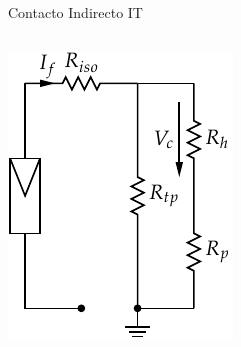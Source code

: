 \documentclass[xcolor={usenames,svgnames,dvipsnames}]{beamer}
\begin{document}
\begin{frame}[label={sec:org03291de}]{Contacto Indirecto IT}
\begin{columns}
\begin{column}{0.5\columnwidth}
\begin{center}
\includegraphics[width=\textwidth]{../figs/ContactoIndirectoIT_simple.pdf}
\end{center}
\end{column}
\end{columns}
\end{frame}
\end{document}
